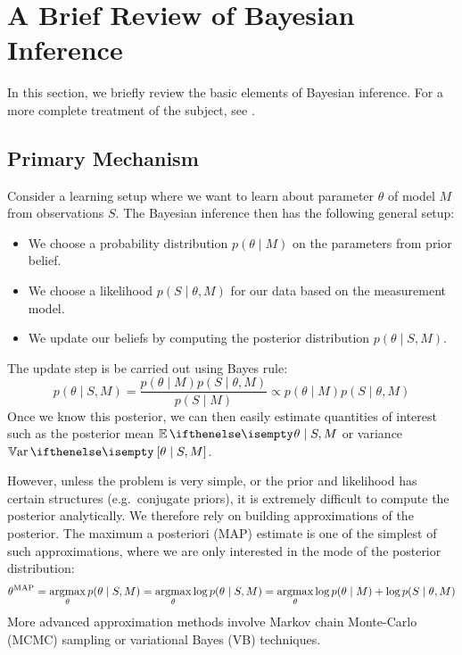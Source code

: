 \section{A Brief Review of Bayesian Inference}

In this section, we briefly review the basic elements of Bayesian inference. For
a more complete treatment of the subject, see \cite{bishop2006pattern,
ghahramani2015probabilistic}.

\subsection{Primary Mechanism}

Consider a learning setup where we want to learn about parameter $\theta$ of
model $M$ from observations $S$. The Bayesian inference then has the following
general setup:
\begin{itemize}
  \item
    We choose a probability distribution $p(\theta \mid M)$ on the parameters
    from prior belief.
  \item
    We choose a likelihood $p(S \mid \theta, M)$ for our data based on the
    measurement model.
  \item
    We update our beliefs by computing the posterior distribution $p(\theta \mid
    S, M)$.
\end{itemize}
The update step is be carried out using Bayes rule:
\begin{equation}
  \label{eq:bayes-update}
  p(\theta \mid S, M) = \frac{p(\theta \mid M) p(S \mid \theta, M)}{p(S \mid M)}
  \propto p(\theta \mid M) p(S \mid \theta, M)
\end{equation}
Once we know this posterior, we can then easily estimate quantities of interest
such as the posterior mean $\Ev{\theta \mid S, M}$ or variance $\Var{\theta \mid
S, M}$.

However, unless the problem is very simple, or the prior and likelihood has
certain structures (e.g.\ conjugate priors), it is extremely difficult to
compute the posterior analytically. We therefore rely on building approximations
of the posterior. The maximum a posteriori (MAP) estimate is one of the simplest
of such approximations, where we are only interested in the mode of the
posterior distribution:
\begin{equation}
  \label{eq:map-estimate}
  \theta^\text{MAP} = \operatorname*{argmax}_\theta p(\theta \mid S, M) = \operatorname*{argmax}_\theta \log
  p(\theta \mid S, M) = \operatorname*{argmax}_\theta \log p(\theta \mid M) + \log p(S \mid
  \theta, M)
\end{equation}
More advanced approximation methods involve Markov chain Monte-Carlo (MCMC)
sampling or variational Bayes (VB) techniques.

